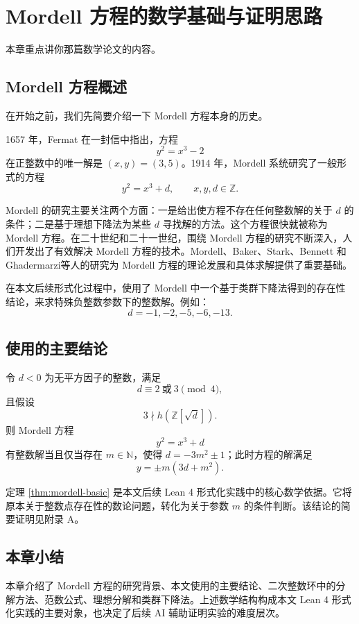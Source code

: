 \newpage
{}
\section{Mordell 方程的数学基础与证明思路}

本章重点讲你那篇数学论文的内容。

\subsection{Mordell 方程概述}

在开始之前，我们先简要介绍一下 Mordell 方程本身的历史。

1657 年，Fermat 在一封信中指出，方程
\[
y^2=x^3-2
\]
在正整数中的唯一解是 \((x,y)=(3,5)\)\cite{Fermat1894}。1914 年，Mordell\cite{Mordell1914} 系统研究了一般形式的方程
\[
y^2=x^3+d,\qquad x,y,d\in\mathbb{Z}.
\]

Mordell 的研究主要关注两个方面：一是给出使方程不存在任何整数解的关于 \(d\) 的条件；二是基于理想下降法为某些 \(d\) 寻找解的方法。这个方程很快就被称为 Mordell 方程。在二十世纪和二十一世纪，围绕 Mordell 方程的研究不断深入，人们开发出了有效解决 Mordell 方程的技术。Mordell\cite{Mordell1914,Mordell1920,Mordell1969}、Baker\cite{Baker1968}、Stark\cite{Stark1973}、Bennett 和 Ghadermarzi\cite{Bennett2015}等人的研究为 Mordell 方程的理论发展和具体求解提供了重要基础。

在本文后续形式化过程中，使用了 Mordell\cite{Mordell1914} 中一个基于类群下降法得到的存在性结论，来求特殊负整数参数下的整数解。例如：
\[
d=-1,-2,-5,-6,-13.
\]

\subsection{使用的主要结论}

\begin{theorem}\label{thm:mordell-basic}
令 \(d<0\) 为无平方因子的整数，满足
\[
d\equiv 2\ \text{或}\ 3 \pmod{4},
\]
且假设
\[
3\nmid h(\mathbb{Z}[\sqrt d]).
\]
则 Mordell 方程
\[
y^2=x^3+d
\]
有整数解当且仅当存在 \(m\in\mathbb{N}\)，使得 \(d=-3m^2\pm 1\)；此时方程的解满足
\[
y=\pm m(3d+m^2).
\]
\end{theorem}

定理 \ref{thm:mordell-basic} 是本文后续 Lean 4 形式化实践中的核心数学依据。它将原本关于整数点存在性的数论问题，转化为关于参数 \(m\) 的条件判断。该结论的简要证明见附录 A。

\subsection{本章小结}

本章介绍了 Mordell 方程的研究背景、本文使用的主要结论、二次整数环中的分解方法、范数公式、理想分解和类群下降法。上述数学结构构成本文 Lean 4 形式化实践的主要对象，也决定了后续 AI 辅助证明实验的难度层次。


